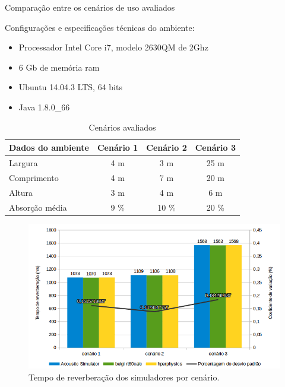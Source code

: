 \begin{frame}[allowframebreaks]{Comparação entre os cenários de uso avaliados}

Configurações e especificações técnicas do ambiente:
\begin{itemize}
\item Processador Intel Core i7, modelo 2630QM de 2Ghz 
\item 6 Gb de memória ram 
\item Ubuntu 14.04.3 LTS, 64 bits 
\item Java 1.8.0\_66
\end{itemize}

\begin{table}[]
\centering
\caption{Cenários avaliados}
\label{cenarios}
\begin{tabular}{|l|c|c|c|}
\hline
\textbf{Dados do ambiente} & \multicolumn{1}{l|}{\textbf{Cenário 1}} & \multicolumn{1}{l|}{\textbf{Cenário 2}} & \multicolumn{1}{l|}{\textbf{Cenário 3}} \\ \hline
Largura              & 4 m                  & 3 m                & 25 m            \\
Comprimento          & 4 m                  & 7 m                & 20 m            \\
Altura               & 3 m                  & 4 m                & 6  m            \\
Absorção média       & 9 \%                 & 10 \%              & 20 \%           \\ \hline
\end{tabular}
\end{table}
  
  \begin{figure}[t]
    \centering
    \includegraphics[height=\dimexpr10\textheight/14\relax]{figuras/comparacao}
    \caption{Tempo de reverberação dos simuladores por cenário.}
  \end{figure} 
\end{frame}